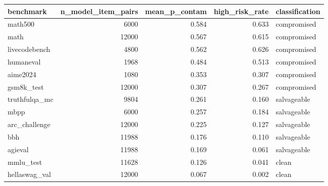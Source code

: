 \begin{tabular}{lrrrl}
\toprule
benchmark & n_model_item_pairs & mean_p_contam & high_risk_rate & classification \\
\midrule
math500 & 6000 & 0.584 & 0.633 & compromised \\
math & 12000 & 0.567 & 0.615 & compromised \\
livecodebench & 4800 & 0.562 & 0.626 & compromised \\
humaneval & 1968 & 0.484 & 0.513 & compromised \\
aime2024 & 1080 & 0.353 & 0.307 & compromised \\
gsm8k_test & 12000 & 0.307 & 0.267 & compromised \\
truthfulqa_mc & 9804 & 0.261 & 0.160 & salvageable \\
mbpp & 6000 & 0.257 & 0.184 & salvageable \\
arc_challenge & 12000 & 0.225 & 0.127 & salvageable \\
bbh & 11988 & 0.176 & 0.110 & salvageable \\
agieval & 11988 & 0.169 & 0.061 & salvageable \\
mmlu_test & 11628 & 0.126 & 0.041 & clean \\
hellaswag_val & 12000 & 0.067 & 0.002 & clean \\
\bottomrule
\end{tabular}
